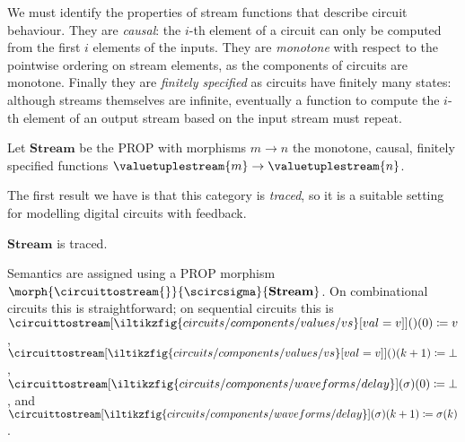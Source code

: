 \documentclass[10pt]{article}
\begin{document}
We must identify the properties of stream functions that describe circuit
behaviour.
They are \emph{causal}: the \(i\)-th element of a circuit can only be computed
from the first \(i\) elements of the inputs.
They are \emph{monotone} with respect to the pointwise ordering on stream
elements, as the components of circuits are monotone.
Finally they are \emph{finitely specified} as circuits have finitely many
states: although streams themselves are infinite, eventually a function to
compute the \(i\)-th element of an output stream based on the input stream must
repeat.

\begin{definition}
    Let \(\mathbf{Stream}\) be the PROP with morphisms \(m \to n\) the monotone,
    causal, finitely specified functions
    \(\valuetuplestream{m} \to \valuetuplestream{n}\).
\end{definition}

The first result we have is that this category is \emph{traced}, so it is a
suitable setting for modelling digital circuits with feedback.

\begin{proposition}
    \(\mathbf{Stream}\) is traced.
\end{proposition}

Semantics are assigned using a PROP morphism
\(\morph{\circuittostream{}}{\scircsigma}{\mathbf{Stream}}\).
On combinational circuits this is straightforward;  on sequential circuits this
is \(
\circuittostream[
    \iltikzfig{circuits/components/values/vs}[val=v]
]{}()(0)
\coloneqq
v
\), \(
\circuittostream[
    \iltikzfig{circuits/components/values/vs}[val=v]
]{}()(k+1)
\coloneqq
\bot
\), \(
\circuittostream[
    \iltikzfig{circuits/components/waveforms/delay}
]{}(\sigma)(0)
\coloneqq
\bot
\), and \(
\circuittostream[
    \iltikzfig{circuits/components/waveforms/delay}
]{}(\sigma)(k+1)
\coloneqq
\sigma(k)
\).
\end{document}
